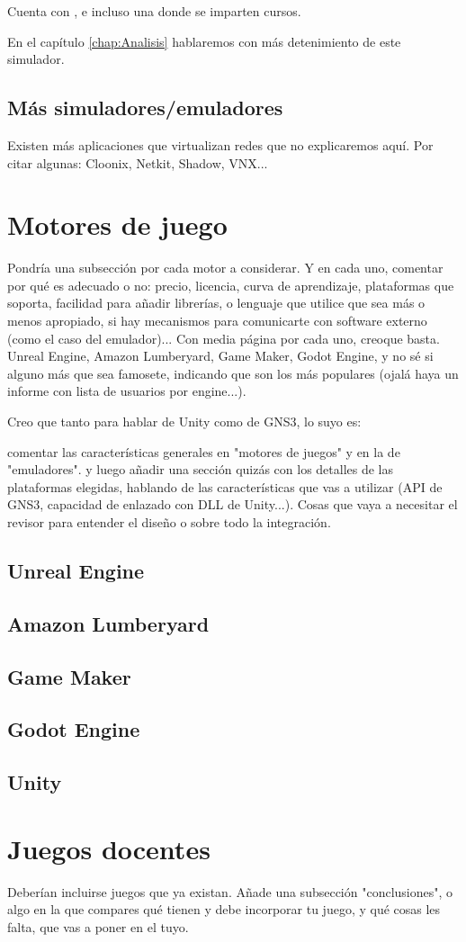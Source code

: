 Cuenta con ,  e incluso una  donde se imparten cursos.  

En el capítulo \ref{chap:Analisis} hablaremos con más detenimiento de este simulador.

\subsection{Más simuladores/emuladores}
Existen más aplicaciones que virtualizan redes que no explicaremos aquí. Por citar algunas: Cloonix, Netkit, Shadow, VNX...


\section{Motores de juego}
Pondría una subsección por cada motor a considerar. Y en cada uno, comentar por qué es adecuado o no: precio, licencia, curva de aprendizaje, plataformas que soporta, facilidad para añadir librerías, o lenguaje que utilice que sea más o menos apropiado, si hay mecanismos para comunicarte con software externo (como el caso del emulador)... Con media página por cada uno, creoque basta. Unreal Engine, Amazon Lumberyard, Game Maker, Godot Engine, y no sé si alguno más que sea famosete, indicando que son los más populares (ojalá haya un informe con lista de usuarios por engine...).

Creo que tanto para hablar de Unity como de GNS3, lo suyo es:

comentar las características generales en "motores de juegos" y en la de "emuladores". y luego añadir una sección quizás con los detalles de las plataformas elegidas, hablando de las características que vas a utilizar (API de GNS3, capacidad de enlazado con DLL de Unity...). Cosas que vaya a necesitar el revisor para entender el diseño o sobre todo la integración.

\subsection{Unreal Engine}

\subsection{Amazon Lumberyard}

\subsection{Game Maker}

\subsection{Godot Engine}

\subsection{Unity}

\section{Juegos docentes}
Deberían incluirse juegos que ya existan. Añade una subsección "conclusiones", o algo en la que compares qué tienen y debe incorporar tu juego, y qué cosas les falta, que vas a poner en el tuyo.